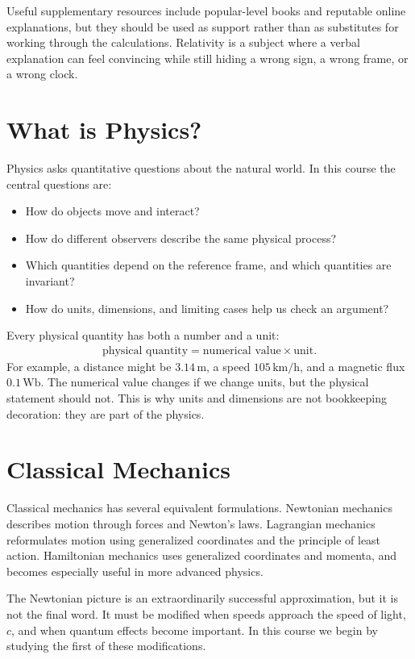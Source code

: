 \documentclass[12pt]{article}
\newcommand{\be}{\begin{eqnarray}}
\newcommand{\ee}{\end{eqnarray}}
\begin{document}
Useful supplementary resources include popular-level books and reputable online explanations, but they should be used as support rather than as substitutes for working through the calculations. Relativity is a subject where a verbal explanation can feel convincing while still hiding a wrong sign, a wrong frame, or a wrong clock.

\section{What is Physics?}
Physics asks quantitative questions about the natural world. In this course the central questions are:
\begin{itemize}
    \item How do objects move and interact?
    \item How do different observers describe the same physical process?
    \item Which quantities depend on the reference frame, and which quantities are invariant?
    \item How do units, dimensions, and limiting cases help us check an argument?
\end{itemize}

Every physical quantity has both a number and a unit:
\be
\text{physical quantity} = \text{numerical value} \times \text{unit}.
\ee
For example, a distance might be $3.14\,\mathrm{m}$, a speed $105\,\mathrm{km/h}$, and a magnetic flux $0.1\,\mathrm{Wb}$. The numerical value changes if we change units, but the physical statement should not. This is why units and dimensions are not bookkeeping decoration: they are part of the physics.

\section{Classical Mechanics}
Classical mechanics has several equivalent formulations. Newtonian mechanics describes motion through forces and Newton's laws. Lagrangian mechanics reformulates motion using generalized coordinates and the principle of least action. Hamiltonian mechanics uses generalized coordinates and momenta, and becomes especially useful in more advanced physics.

The Newtonian picture is an extraordinarily successful approximation, but it is not the final word. It must be modified when speeds approach the speed of light, $c$, and when quantum effects become important. In this course we begin by studying the first of these modifications.
\end{document}
